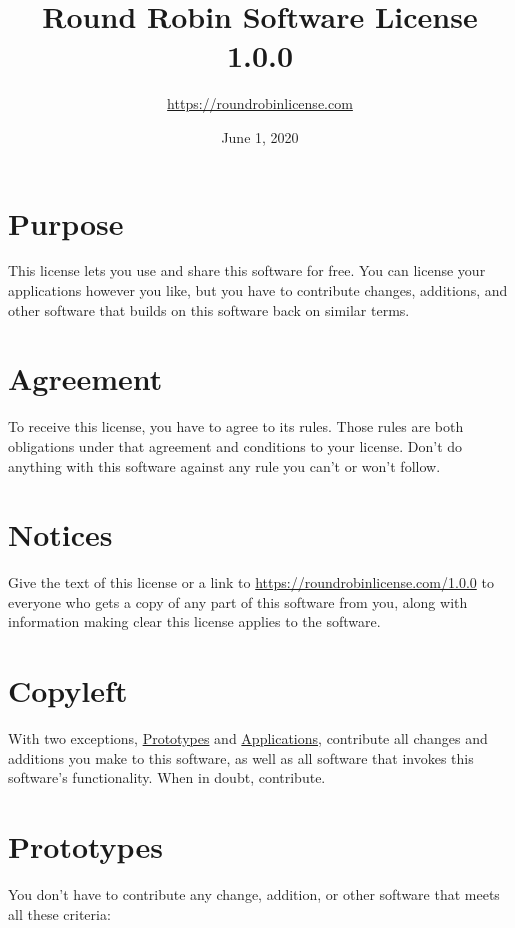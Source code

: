 \documentclass[12pt,letterpaper]{article}
\title{\textbf{Round Robin Software License 1.0.0}}
\author{\url{https://roundrobinlicense.com}}
\date{June 1, 2020}
\begin{document}
\maketitle

\section*{Purpose}

This license lets you use and share this software for free. You can
license your applications however you like, but you have to contribute
changes, additions, and other software that builds on this software back
on similar terms.

\section*{Agreement}

To receive this license, you have to agree to its rules. Those rules are
both obligations under that agreement and conditions to your license.
Don't do anything with this software against any rule you can't or won't
follow.

\hypertarget{Notices}{\section*{Notices}}

Give the text of this license or a link to
\url{https://roundrobinlicense.com/1.0.0} to everyone who gets a copy of
any part of this software from you, along with information making clear
this license applies to the software.

\section*{Copyleft}

With two exceptions, \hyperlink{Prototypes}{Prototypes} and
\hyperlink{Applications}{Applications}, contribute all changes
and additions you make to this software, as well as all software that
invokes this software's functionality. When in doubt, contribute.

\hypertarget{Prototypes}{\section*{Prototypes}}

You don't have to contribute any change, addition, or other software
that meets all these criteria:
\end{document}
